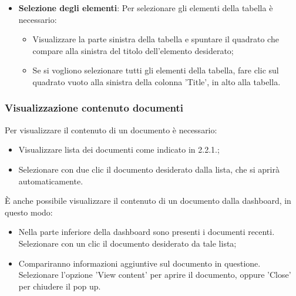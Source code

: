 \documentclass[10pt, a4paper]{article}
\begin{document}
\begin{itemize}
\begin{itemize}
\end{itemize}
\item \textbf{Selezione degli elementi}: Per selezionare gli elementi della tabella è necessario:
\begin{itemize}
    \item Visualizzare la parte sinistra della tabella e spuntare il quadrato che compare alla sinistra del titolo dell'elemento desiderato;
    \item Se si vogliono selezionare tutti gli elementi della tabella, fare clic sul quadrato vuoto alla sinistra della colonna 'Title', in alto alla tabella.
\end{itemize}
\end{itemize}
\subsubsection{Visualizzazione contenuto documenti}
Per visualizzare il contenuto di un documento è necessario:
\begin{itemize}
    \item Visualizzare lista dei documenti come indicato in 2.2.1.;
    \item Selezionare con due clic il documento desiderato dalla lista, che si aprirà automaticamente.
\end{itemize}
È anche possibile visualizzare il contenuto di un documento dalla dashboard, in questo modo:
\begin{itemize}
    \item Nella parte inferiore della dashboard sono presenti i documenti recenti. Selezionare con un clic il documento desiderato da tale lista;
    \item Compariranno informazioni aggiuntive sul documento in questione. Selezionare l'opzione 'View content' per aprire il documento, oppure 'Close' per chiudere il pop up.
\end{itemize}
\end{document}
